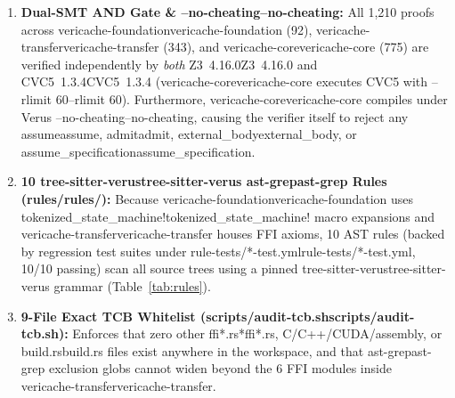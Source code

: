 \documentclass[11pt,a4paper]{article}
\let\origunderscore\_
\DeclareRobustCommand{\code}[1]{{\ttfamily\ifmmode #1\else\def\_{\origunderscore\hspace{0pt}}#1\fi}}
\begin{document}
\begin{enumerate}
  \item \textbf{Dual-SMT AND Gate \& \code{--no-cheating}:} All 1,210 proofs across \code{vericache-foundation} (92), \code{vericache-transfer} (343), and \code{vericache-core} (775) are verified independently by \emph{both} \code{Z3~4.16.0} and \code{CVC5~1.3.4} (\code{vericache-core} executes CVC5 with \code{--rlimit 60}). Furthermore, \code{vericache-core} compiles under Verus \code{--no-cheating}, causing the verifier itself to reject any \code{assume}, \code{admit}, \code{external\_body}, or \code{assume\_specification}.
  \item \textbf{10 \code{tree-sitter-verus} \code{ast-grep} Rules (\code{rules/}):} Because \code{vericache-foundation} uses \code{tokenized\_state\_machine!} macro expansions and \code{vericache-transfer} houses FFI axioms, 10 AST rules (backed by regression test suites under \code{rule-tests/*-test.yml}, 10/10 passing) scan all source trees using a pinned \code{tree-sitter-verus} grammar (Table~\ref{tab:rules}).
  \item \textbf{9-File Exact TCB Whitelist (\code{scripts/audit-tcb.sh}):} Enforces that zero other \code{*ffi*.rs}, C/C++/CUDA/assembly, or \code{build.rs} files exist anywhere in the workspace, and that \code{ast-grep} exclusion globs cannot widen beyond the 6 FFI modules inside \code{vericache-transfer}.
\end{enumerate}
\end{document}
